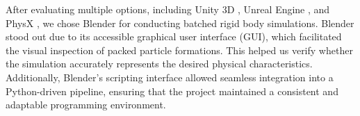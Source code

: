\documentclass[preprint,12pt]{elsarticle}
\begin{document}

After evaluating multiple options, including Unity 3D \citep{unity2024unity}, Unreal Engine \citep{unreal2024epic}, and PhysX \citep{nvidia2024nvidia}, we chose Blender \citep{blender2023objectops} for conducting batched rigid body simulations. 
Blender stood out due to its accessible graphical user interface (GUI), which facilitated the visual inspection of packed particle formations. 
This helped us verify whether the simulation accurately represents the desired physical characteristics.
Additionally, Blender's scripting interface allowed seamless integration into a Python-driven pipeline, ensuring that the project maintained a consistent and adaptable programming environment.
\end{document}
